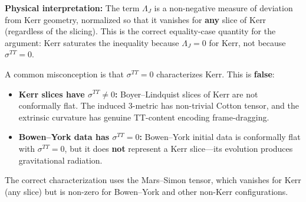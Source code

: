 \begin{definition}
\textbf{Physical interpretation:} The term $\Lambda_J$ is a non-negative measure of deviation from Kerr geometry, normalized so that it vanishes for \textbf{any} slice of Kerr (regardless of the slicing). This is the correct equality-case quantity for the argument: Kerr saturates the inequality because $\Lambda_J = 0$ for Kerr, not because $\sigma^{TT} = 0$.
\end{definition}

\begin{remark}\label{rem:sigmaTT-insufficient}
A common misconception is that $\sigma^{TT} = 0$ characterizes Kerr. This is \textbf{false}:
\begin{itemize}
    \item \textbf{Kerr slices have $\sigma^{TT} \neq 0$:} Boyer--Lindquist slices of Kerr are not conformally flat. The induced 3-metric has non-trivial Cotton tensor, and the extrinsic curvature has genuine TT-content encoding frame-dragging.
    \item \textbf{Bowen--York data has $\sigma^{TT} = 0$:} Bowen--York initial data \cite{bowen1980} is conformally flat with $\sigma^{TT} = 0$, but it does \textbf{not} represent a Kerr slice---its evolution produces gravitational radiation.
\end{itemize}
The correct characterization uses the Mars--Simon tensor, which vanishes for Kerr (any slice) but is non-zero for Bowen--York and other non-Kerr configurations.
\end{remark}

